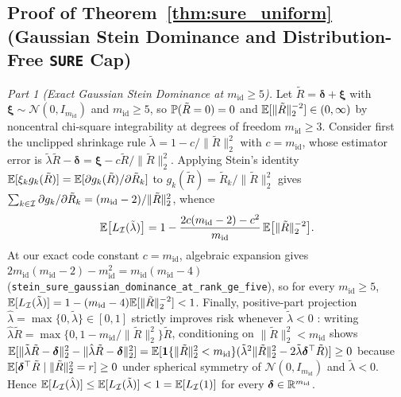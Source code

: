 \subsection{Proof of Theorem~\ref*{thm:sure_uniform} (Gaussian Stein Dominance and Distribution-Free \texttt{SURE} Cap)}

\emph{Part 1 (Exact Gaussian Stein Dominance at $m_{\mathrm{id}} \ge 5$).} Let $\tilde{R} = \bm{\delta} + \bm{\xi}$ with $\bm{\xi} \sim \mathcal{N}(0, I_{m_{\mathrm{id}}})$ and $m_{\mathrm{id}} \ge 5$, so $\mathbb{P}(\tilde{R}=0)=0$ and $\mathbb{E}[\|\tilde{R}\|_2^{-2}] \in (0, \infty)$ by noncentral chi-square integrability at degrees of freedom $m_{\mathrm{id}} \ge 3$. Consider first the unclipped shrinkage rule $\tilde{\lambda} = 1 - c/\|\tilde{R}\|_2^2$ with $c = m_{\mathrm{id}}$, whose estimator error is $\tilde{\lambda}\tilde{R} - \bm{\delta} = \bm{\xi} - c\tilde{R}/\|\tilde{R}\|_2^2$. Applying Stein's identity $\mathbb{E}[\xi_k g_k(\tilde{R})] = \mathbb{E}[\partial g_k(\tilde{R})/\partial \tilde{R}_k]$ to $g_k(\tilde{R}) = \tilde{R}_k / \|\tilde{R}\|_2^2$ gives $\sum_{k \in \mathcal{I}} \partial g_k/\partial \tilde{R}_k = (m_{\mathrm{id}} - 2)/\|\tilde{R}\|_2^2$, whence
\[
  \mathbb{E}\big[L_{\mathcal{I}}(\tilde{\lambda})\big]
  = 1 - \frac{2 c (m_{\mathrm{id}} - 2) - c^2}{m_{\mathrm{id}}}\,\mathbb{E}\big[\|\tilde{R}\|_2^{-2}\big].
\]
At our exact code constant $c = m_{\mathrm{id}}$, algebraic expansion gives $2 m_{\mathrm{id}}(m_{\mathrm{id}} - 2) - m_{\mathrm{id}}^2 = m_{\mathrm{id}}(m_{\mathrm{id}} - 4)$ (\texttt{stein\_sure\_gaussian\_dominance\_at\_rank\_ge\_five}), so for every $m_{\mathrm{id}} \ge 5$, $\mathbb{E}[L_{\mathcal{I}}(\tilde{\lambda})] = 1 - (m_{\mathrm{id}} - 4)\mathbb{E}[\|\tilde{R}\|_2^{-2}] < 1$. Finally, positive-part projection $\hat{\lambda} = \max\{0, \tilde{\lambda}\} \in [0, 1]$ strictly improves risk whenever $\tilde{\lambda} < 0$ \citep{baranchik1970family}: writing $\hat{\lambda}\tilde{R} = \max\{0, 1 - m_{\mathrm{id}}/\|\tilde{R}\|_2^2\}\tilde{R}$, conditioning on $\|\tilde{R}\|_2^2 < m_{\mathrm{id}}$ shows $\mathbb{E}[\|\tilde{\lambda}\tilde{R} - \bm{\delta}\|_2^2 - \|\hat{\lambda}\tilde{R} - \bm{\delta}\|_2^2] = \mathbb{E}[\mathbf{1}\{\|\tilde{R}\|_2^2 < m_{\mathrm{id}}\}(\tilde{\lambda}^2\|\tilde{R}\|_2^2 - 2\tilde{\lambda}\bm{\delta}^\top\tilde{R})] \ge 0$ because $\mathbb{E}[\bm{\delta}^\top\tilde{R} \mid \|\tilde{R}\|_2^2 = r] \ge 0$ under spherical symmetry of $\mathcal{N}(0, I_{m_{\mathrm{id}}})$ and $\tilde{\lambda} < 0$. Hence $\mathbb{E}[L_{\mathcal{I}}(\hat{\lambda})] \le \mathbb{E}[L_{\mathcal{I}}(\tilde{\lambda})] < 1 = \mathbb{E}[L_{\mathcal{I}}(1)]$ for every $\bm{\delta} \in \mathbb{R}^{m_{\mathrm{id}}}$.

